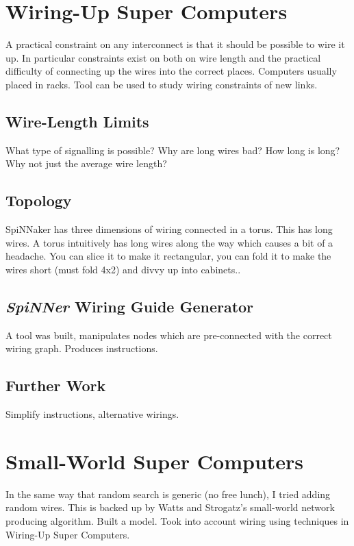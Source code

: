 	\section{Wiring-Up Super Computers}
		
		A practical constraint on any interconnect is that it should be possible to
		wire it up. In particular constraints exist on both on wire length and the
		practical difficulty of connecting up the wires into the correct places.
		Computers usually placed in racks. Tool can be used to study wiring
		constraints of new links.
		
		\subsection{Wire-Length Limits}
			
			What type of signalling is possible? Why are long wires bad? How long is
			long? Why not just the average wire length?
		
		\subsection{Topology}
			
			SpiNNaker has three dimensions of wiring connected in a torus. This has
			long wires. A torus intuitively has long wires along the way which causes
			a bit of a headache. You can slice it to make it rectangular, you can fold
			it to make the wires short (must fold 4x2) and divvy up into cabinets..
		
		\subsection{\emph{SpiNNer} Wiring Guide Generator}
			
			A tool was built, manipulates nodes which are pre-connected with the
			correct wiring graph. Produces instructions.
		
		\subsection{Further Work}
			
			Simplify instructions, alternative wirings.
	
	\section{Small-World Super Computers}
		
		In the same way that random search is generic (no free lunch), I tried
		adding random wires. This is backed up by Watts and Strogatz's small-world
		network producing algorithm. Built a model. Took into account wiring using
		techniques in Wiring-Up Super Computers.
		
